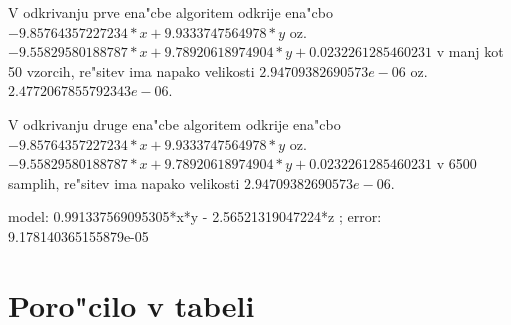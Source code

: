 \documentclass[10pt,a4paper]{article}
\begin{document}
V odkrivanju prve ena"cbe algoritem odkrije ena"cbo
$-9.85764357227234*x + 9.9333747564978*y$ oz. 
$-9.55829580188787*x + 9.78920618974904*y + 0.0232261285460231$
v manj kot 50 vzorcih, re"sitev ima napako velikosti
$2.94709382690573e-06$ oz. $2.4772067855792343e-06$.

V odkrivanju druge ena"cbe algoritem odkrije ena"cbo
$-9.85764357227234*x + 9.9333747564978*y$ oz. 
$-9.55829580188787*x + 9.78920618974904*y + 0.0232261285460231$
v 6500 samplih, re"sitev ima napako velikosti
$2.94709382690573e-06$.


model: 0.991337569095305*x*y - 2.56521319047224*z                            ; error: 9.178140365155879e-05
\section{Poro"cilo v tabeli}
\newcommand{\asui}{rf-100,10  }
 \newcommand{\asuii}{glm        }
 \newcommand{\asuiii}{glm        }
 \newcommand{\asuiv}{squared+glm}
 \newcommand{\nui}{625}
 \newcommand{\nuii}{562}
 \newcommand{\nuiii}{500}
 \newcommand{\nuiv}{438}
 \newcommand{\eui}{0.00000}
 \newcommand{\euii}{0.00000}
 \newcommand{\euiii}{0.00000}
 \newcommand{\euiv}{0.00000}
 \newcommand{\nti}{625}
 \newcommand{\ntii}{563}
 \newcommand{\ntiii}{500}
 \newcommand{\ntiv}{438}
 \newcommand{\eti}{0.00000}
 \newcommand{\etii}{0.00000}
 \newcommand{\etiii}{0.00000}
 \newcommand{\etiv}{0.00000}

\end{document}
